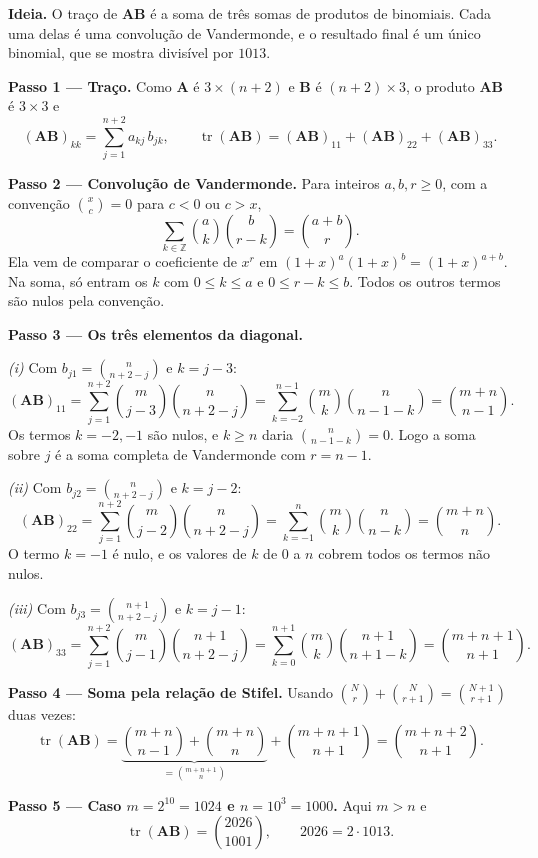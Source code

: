 \documentclass{article}%
\begin{document}
\textbf{Ideia.} O traço de $\mathbf{A}\mathbf{B}$ é a soma de três somas de produtos de binomiais. Cada uma delas é uma convolução de Vandermonde, e o resultado final é um único binomial, que se mostra divisível por $1013$.

\textbf{Passo 1 --- Traço.} Como $\mathbf{A}$ é $3\times(n+2)$ e $\mathbf{B}$ é $(n+2)\times 3$, o produto $\mathbf{A}\mathbf{B}$ é $3\times3$ e
\[
(\mathbf{A}\mathbf{B})_{kk}=\sum_{j=1}^{n+2}a_{kj}\,b_{jk},\qquad \operatorname{tr}(\mathbf{A}\mathbf{B})=(\mathbf{A}\mathbf{B})_{11}+(\mathbf{A}\mathbf{B})_{22}+(\mathbf{A}\mathbf{B})_{33}.
\]

\textbf{Passo 2 --- Convolução de Vandermonde.} Para inteiros $a,b,r\ge 0$, com a convenção $\binom{x}{c}=0$ para $c<0$ ou $c>x$,
\[
\sum_{k\in\mathbb{Z}}\binom{a}{k}\binom{b}{r-k}=\binom{a+b}{r}.
\]
Ela vem de comparar o coeficiente de $x^r$ em $(1+x)^a(1+x)^b=(1+x)^{a+b}$. Na soma, só entram os $k$ com $0\le k\le a$ e $0\le r-k\le b$. Todos os outros termos são nulos pela convenção.

\textbf{Passo 3 --- Os três elementos da diagonal.}

\emph{(i)} Com $b_{j1}=\binom{n}{n+2-j}$ e $k=j-3$:
\[
(\mathbf{A}\mathbf{B})_{11}=\sum_{j=1}^{n+2}\binom{m}{j-3}\binom{n}{n+2-j}=\sum_{k=-2}^{n-1}\binom{m}{k}\binom{n}{n-1-k}=\binom{m+n}{n-1}.
\]
Os termos $k=-2,-1$ são nulos, e $k\ge n$ daria $\binom{n}{n-1-k}=0$. Logo a soma sobre $j$ é a soma completa de Vandermonde com $r=n-1$.

\emph{(ii)} Com $b_{j2}=\binom{n}{n+2-j}$ e $k=j-2$:
\[
(\mathbf{A}\mathbf{B})_{22}=\sum_{j=1}^{n+2}\binom{m}{j-2}\binom{n}{n+2-j}=\sum_{k=-1}^{n}\binom{m}{k}\binom{n}{n-k}=\binom{m+n}{n}.
\]
O termo $k=-1$ é nulo, e os valores de $k$ de $0$ a $n$ cobrem todos os termos não nulos.

\emph{(iii)} Com $b_{j3}=\binom{n+1}{n+2-j}$ e $k=j-1$:
\[
(\mathbf{A}\mathbf{B})_{33}=\sum_{j=1}^{n+2}\binom{m}{j-1}\binom{n+1}{n+2-j}=\sum_{k=0}^{n+1}\binom{m}{k}\binom{n+1}{n+1-k}=\binom{m+n+1}{n+1}.
\]

\textbf{Passo 4 --- Soma pela relação de Stifel.} Usando $\binom{N}{r}+\binom{N}{r+1}=\binom{N+1}{r+1}$ duas vezes:
\[
\operatorname{tr}(\mathbf{A}\mathbf{B})=\underbrace{\binom{m+n}{n-1}+\binom{m+n}{n}}_{=\binom{m+n+1}{n}}+\binom{m+n+1}{n+1}=\binom{m+n+2}{n+1}.
\]

\textbf{Passo 5 --- Caso $m=2^{10}=1024$ e $n=10^3=1000$.} Aqui $m>n$ e
\[
\operatorname{tr}(\mathbf{A}\mathbf{B})=\binom{2026}{1001},\qquad 2026=2\cdot 1013.
\]
\end{document}
